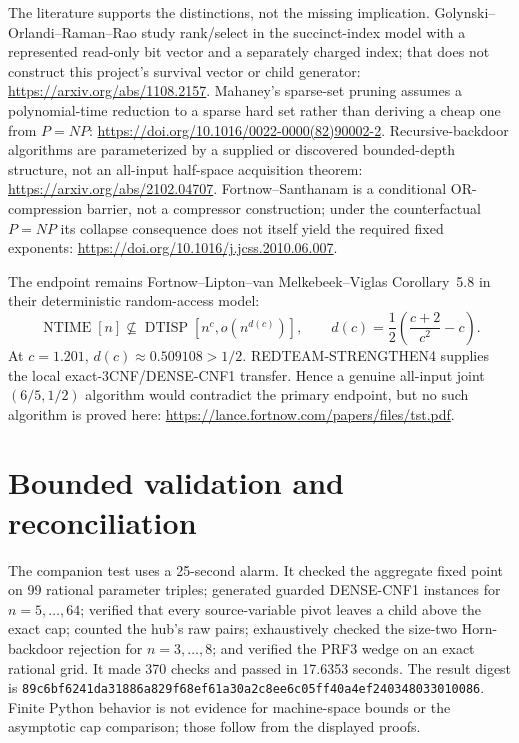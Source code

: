 \documentclass[11pt]{article}
\begin{document}
The literature supports the distinctions, not the missing implication.
Golynski--Orlandi--Raman--Rao study rank/select in the succinct-index model
with a represented read-only bit vector and a separately charged index; that
does not construct this project's survival vector or child generator:
\url{https://arxiv.org/abs/1108.2157}.  Mahaney's sparse-set pruning assumes a
polynomial-time reduction to a sparse hard set rather than deriving a cheap
one from $P=NP$:
\url{https://doi.org/10.1016/0022-0000(82)90002-2}.
Recursive-backdoor algorithms are parameterized by a supplied or discovered
bounded-depth structure, not an all-input half-space acquisition theorem:
\url{https://arxiv.org/abs/2102.04707}.
Fortnow--Santhanam is a conditional OR-compression barrier, not a compressor
construction; under the counterfactual $P=NP$ its collapse consequence does
not itself yield the required fixed exponents:
\url{https://doi.org/10.1016/j.jcss.2010.06.007}.

The endpoint remains Fortnow--Lipton--van Melkebeek--Viglas Corollary~5.8 in
their deterministic random-access model:
\[
 \operatorname{NTIME}[n]\not\subseteq
 \operatorname{DTISP}[n^c,o(n^{d(c)})],\qquad
 d(c)=\frac12\left(\frac{c+2}{c^2}-c\right).
\]
At $c=1.201$, $d(c)\approx0.509108>1/2$.  REDTEAM-STRENGTHEN4 supplies the
local exact-3CNF/DENSE-CNF1 transfer.  Hence a genuine all-input joint
$(6/5,1/2)$ algorithm would contradict the primary endpoint, but no such
algorithm is proved here:
\url{https://lance.fortnow.com/papers/files/tst.pdf}.

\section{Bounded validation and reconciliation}

The companion test uses a 25-second alarm.  It checked the aggregate fixed
point on 99 rational parameter triples; generated guarded DENSE-CNF1 instances
for $n=5,\ldots,64$; verified that every source-variable pivot leaves a child
above the exact cap; counted the hub's raw pairs; exhaustively checked the
size-two Horn-backdoor rejection for $n=3,\ldots,8$; and verified the PRF3
wedge on an exact rational grid.  It made 370 checks and passed in 17.6353
seconds.  The result digest is
\texttt{89c6bf6241da31886a829f68ef61a30a2c8ee6c05ff40a4ef240348033010086}.
Finite Python behavior is not evidence for machine-space bounds or the
asymptotic cap comparison; those follow from the displayed proofs.
\end{document}
